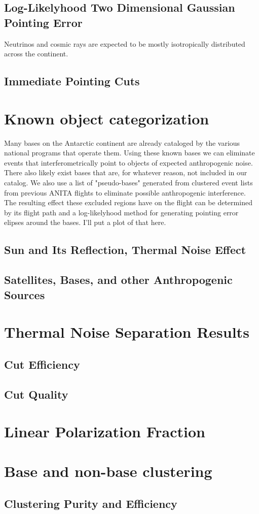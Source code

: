 		
	\subsection{Log-Likelyhood Two Dimensional Gaussian Pointing Error}
		Neutrinos and cosmic rays are expected to be mostly isotropically distributed across the continent.  
	
	\subsection{Immediate Pointing Cuts}


\section{Known object categorization}
	Many bases on the Antarctic continent are already cataloged by the various national programs that operate them.  Using these known bases we can eliminate events that interferometrically point to objects of expected anthropogenic noise.  There also likely exist bases that are, for whatever reason, not included in our catalog.  We also use a list of "pseudo-bases" generated from clustered event lists from previous ANITA flights to eliminate possible anthropogenic interference.  The resulting effect these excluded regions have on the flight can be determined by its flight path and a log-likelyhood method for generating pointing error elipses around the bases.  I'll put a plot of that here.
	\subsection{Sun and Its Reflection, Thermal Noise Effect}
	\subsection{Satellites, Bases, and other Anthropogenic Sources}

\section{Thermal Noise Separation Results}
	\subsection{Cut Efficiency}
	\subsection{Cut Quality}


\section{Linear Polarization Fraction}


\section{Base and non-base clustering}
	\subsection{Clustering Purity and Efficiency}
